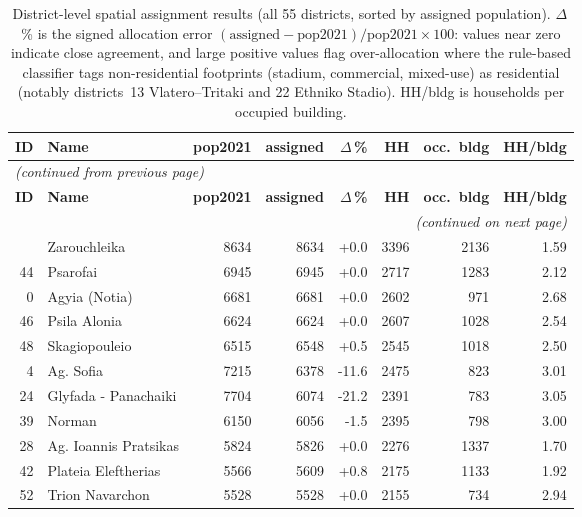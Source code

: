\begin{scriptsize}
\setlength\tabcolsep{3pt}
\renewcommand{\arraystretch}{0.85}
\begin{longtable}{rp{3.4cm}rrrrrr}
\caption{District-level spatial assignment results (all 55 districts, sorted by assigned population). $\Delta$\,\% is the signed allocation error $(\text{assigned}-\text{pop2021})/\text{pop2021}\times100$: values near zero indicate close agreement, and large positive values flag over-allocation where the rule-based classifier tags non-residential footprints (stadium, commercial, mixed-use) as residential (notably districts~13 Vlatero--Tritaki and 22 Ethniko Stadio). HH/bldg is households per occupied building.}\label{tab:results}\\
\toprule
\textbf{ID} & \textbf{Name} & \textbf{pop2021} & \textbf{assigned} & \textbf{$\Delta$\,\%} & \textbf{HH} & \textbf{occ.\ bldg} & \textbf{HH/bldg} \\
\midrule
\endfirsthead
\multicolumn{8}{l}{\footnotesize\textit{(continued from previous page)}}\\
\toprule
\textbf{ID} & \textbf{Name} & \textbf{pop2021} & \textbf{assigned} & \textbf{$\Delta$\,\%} & \textbf{HH} & \textbf{occ.\ bldg} & \textbf{HH/bldg} \\
\midrule
\endhead
\midrule
\multicolumn{8}{r}{\footnotesize\textit{(continued on next page)}}\\
\endfoot
\bottomrule
\endlastfoot
54 & Zarouchleika & 8634 & 8634 & +0.0 & 3396 & 2136 & 1.59 \\
44 & Psarofai & 6945 & 6945 & +0.0 & 2717 & 1283 & 2.12 \\
0 & Agyia (Notia) & 6681 & 6681 & +0.0 & 2602 & 971 & 2.68 \\
46 & Psila Alonia & 6624 & 6624 & +0.0 & 2607 & 1028 & 2.54 \\
48 & Skagiopouleio & 6515 & 6548 & +0.5 & 2545 & 1018 & 2.50 \\
4 & Ag. Sofia & 7215 & 6378 & -11.6 & 2475 & 823 & 3.01 \\
24 & Glyfada - Panachaiki & 7704 & 6074 & -21.2 & 2391 & 783 & 3.05 \\
39 & Norman & 6150 & 6056 & -1.5 & 2395 & 798 & 3.00 \\
28 & Ag. Ioannis Pratsikas & 5824 & 5826 & +0.0 & 2276 & 1337 & 1.70 \\
42 & Plateia Eleftherias & 5566 & 5609 & +0.8 & 2175 & 1133 & 1.92 \\
52 & Trion Navarchon & 5528 & 5528 & +0.0 & 2155 & 734 & 2.94 \\

\end{longtable}
\end{scriptsize}
